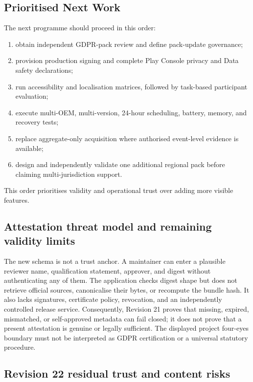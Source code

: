 \subsection{Prioritised Next Work}

The next programme should proceed in this order:

\begin{enumerate}
    \item obtain independent GDPR-pack review and define pack-update governance;
    \item provision production signing and complete Play Console privacy and Data safety declarations;
    \item run accessibility and localisation matrices, followed by task-based participant evaluation;
    \item execute multi-OEM, multi-version, 24-hour scheduling, battery, memory, and recovery tests;
    \item replace aggregate-only acquisition where authorised event-level evidence is available;
    \item design and independently validate one additional regional pack before claiming multi-jurisdiction support.
\end{enumerate}

This order prioritises validity and operational trust over adding more visible features.
\subsection{Attestation threat model and remaining validity limits}

The new schema is not a trust anchor. A maintainer can enter a plausible reviewer name, qualification statement, approver, and digest without authenticating any of them. The application checks digest shape but does not retrieve official sources, canonicalise their bytes, or recompute the bundle hash. It also lacks signatures, certificate policy, revocation, and an independently controlled release service. Consequently, Revision 21 proves that missing, expired, mismatched, or self-approved metadata can fail closed; it does not prove that a present attestation is genuine or legally sufficient. The displayed project four-eyes boundary must not be interpreted as GDPR certification or a universal statutory procedure.

\subsection{Revision 22 residual trust and content risks}

